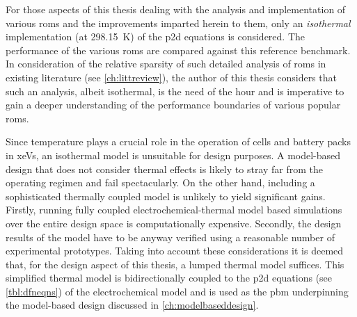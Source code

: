 For those aspects of this thesis dealing with the analysis and implementation of
various  \glspl{rom} and  the  improvements  imparted herein  to  them, only  an
\emph{isothermal}  implementation  (at  \SI{298.15}{\kelvin}) of  the  \gls{p2d}
equations  is  considered.  The  performance  of  the  various  \glspl{rom}  are
compared  against this  reference benchmark.  In consideration  of the  relative
sparsity of  such detailed analysis  of \glspl{rom} in existing  literature (see
\cref{ch:littreview}),  the  author  of  this  thesis  considers  that  such  an
analysis, albeit isothermal, is  the need of the hour and  is imperative to gain
a  deeper  understanding  of  the  performance  boundaries  of  various  popular
\glspl{rom}.


Since temperature  plays a crucial  role in the  operation of cells  and battery
packs in \glspl{xeV},  an isothermal model is unsuitable for  design purposes. A
model-based design that does not consider thermal effects is likely to stray far
from the operating regimen and fail  spectacularly. On the other hand, including
a sophisticated thermally coupled model  is unlikely to yield significant gains.
Firstly, running  fully coupled electrochemical-thermal model  based simulations
over the entire design space  is computationally expensive. Secondly, the design
results  of the  model have  to  be anyway  verified using  a reasonable  number
of  experimental prototypes.  Taking  into account  these  considerations it  is
deemed  that, for  the design  aspect  of this  thesis, a  lumped thermal  model
suffices.  This  simplified thermal  model  is  bidirectionally coupled  to  the
\gls{p2d} equations  (see \cref{tbl:dfneqns})  of the electrochemical  model and
is  used as  the  \gls{pbm}  underpinning the  model-based  design discussed  in
\cref{ch:modelbaseddesign}.

